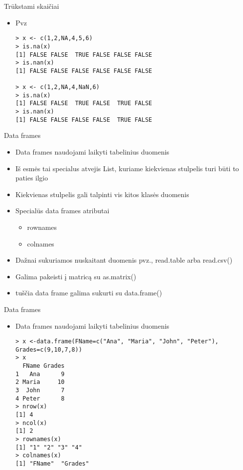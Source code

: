 \documentclass[11pt,xcolor=table]{beamer}
\begin{document}

\begin{frame}[fragile]{Trūkstami skaičiai}
\begin{itemize}
\item Pvz
\begin{lstlisting}
> x <- c(1,2,NA,4,5,6)
> is.na(x)
[1] FALSE FALSE  TRUE FALSE FALSE FALSE
> is.nan(x)
[1] FALSE FALSE FALSE FALSE FALSE FALSE

> x <- c(1,2,NA,4,NaN,6)
> is.na(x)
[1] FALSE FALSE  TRUE FALSE  TRUE FALSE
> is.nan(x)
[1] FALSE FALSE FALSE FALSE  TRUE FALSE
\end{lstlisting}
\end{itemize}
\end{frame}


\begin{frame}[fragile]{Data frames}
\begin{itemize}
\item Data frames naudojami laikyti tabelinius duomenis
\item Iš esmės tai specialus atvejis List, kuriame kiekvienas stulpelis turi būti to paties ilgio
\item Kiekvienas stulpelis gali talpinti vis kitos klasės duomenis
\item Specialūs data frames atributai
\begin{itemize}
\item rownames
\item colnames
\end{itemize}
\item Dažnai sukuriamos nuskaitant duomenis pvz., read.table arba read.csv()
\item Galima pakeisti į matricą su as.matrix()
\item tuščia data frame galima sukurti su data.frame()
\end{itemize}
\end{frame}


\begin{frame}[fragile]{Data frames}
\begin{itemize}
\item Data frames naudojami laikyti tabelinius duomenis
\begin{lstlisting}
> x <-data.frame(FName=c("Ana", "Maria", "John", "Peter"), Grades=c(9,10,7,8))
> x
  FName Grades
1   Ana      9
2 Maria     10
3  John      7
4 Peter      8
> nrow(x)
[1] 4
> ncol(x)
[1] 2
> rownames(x)
[1] "1" "2" "3" "4"
> colnames(x)
[1] "FName"  "Grades"
\end{lstlisting}
\end{itemize}
\end{frame}
\end{document}
